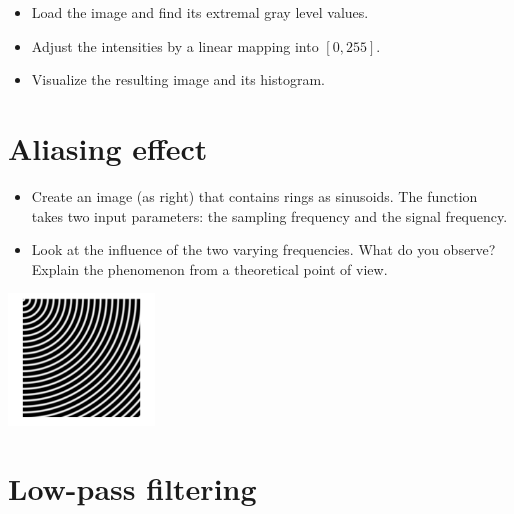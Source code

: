 \begin{qbox}
\begin{itemize}
\item Load the image and find its extremal gray level values.
\item Adjust the intensities by a linear mapping into $[0, 255]$.

\item Visualize the resulting image and its histogram.
\end{itemize}
\end{qbox}

\vspace*{-8pt}

\section{Aliasing effect}

\begin{qbox}
	\begin{minipage}{0.6\textwidth}
\begin{itemize}
\item Create an image (as right) that contains rings as sinusoids. The function takes two input parameters: the sampling frequency and the signal frequency.
\item Look at the influence of the two varying frequencies. What do you observe? Explain the phenomenon from a theoretical point of view.
\end{itemize}
\end{minipage}
\hfill
\begin{minipage}{0.35\textwidth}
	\includegraphics[height=3.5cm]{moire.png}
\end{minipage}
\end{qbox}



\section{Low-pass filtering}

